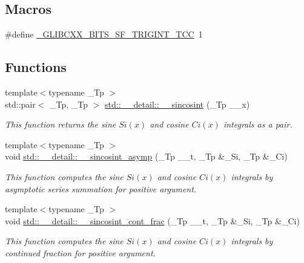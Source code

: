 \subsection*{Macros}
\begin{DoxyCompactItemize}
\item 
\#define \hyperlink{sf__trigint_8tcc_a8ba3ab1895ab4f89f7ee4d01d6db906e}{\+\_\+\+G\+L\+I\+B\+C\+X\+X\+\_\+\+B\+I\+T\+S\+\_\+\+S\+F\+\_\+\+T\+R\+I\+G\+I\+N\+T\+\_\+\+T\+CC}~1
\end{DoxyCompactItemize}
\subsection*{Functions}
\begin{DoxyCompactItemize}
\item 
{\footnotesize template$<$typename \+\_\+\+Tp $>$ }\\std\+::pair$<$ \+\_\+\+Tp, \+\_\+\+Tp $>$ \hyperlink{namespacestd_1_1____detail_a53bf807a99eef68cdb6f917c7ca085bf}{std\+::\+\_\+\+\_\+detail\+::\+\_\+\+\_\+sincosint} (\+\_\+\+Tp \+\_\+\+\_\+x)
\begin{DoxyCompactList}\small\item\em This function returns the sine $ Si(x) $ and cosine $ Ci(x) $ integrals as a {\ttfamily pair}. \end{DoxyCompactList}\item 
{\footnotesize template$<$typename \+\_\+\+Tp $>$ }\\void \hyperlink{namespacestd_1_1____detail_a976c3ff52c54001de3d409900c9bcb9c}{std\+::\+\_\+\+\_\+detail\+::\+\_\+\+\_\+sincosint\+\_\+asymp} (\+\_\+\+Tp \+\_\+\+\_\+t, \+\_\+\+Tp \&\+\_\+\+Si, \+\_\+\+Tp \&\+\_\+\+Ci)
\begin{DoxyCompactList}\small\item\em This function computes the sine $ Si(x) $ and cosine $ Ci(x) $ integrals by asymptotic series summation for positive argument. \end{DoxyCompactList}\item 
{\footnotesize template$<$typename \+\_\+\+Tp $>$ }\\void \hyperlink{namespacestd_1_1____detail_a211f552bca2944f64e3a1f5593690fda}{std\+::\+\_\+\+\_\+detail\+::\+\_\+\+\_\+sincosint\+\_\+cont\+\_\+frac} (\+\_\+\+Tp \+\_\+\+\_\+t, \+\_\+\+Tp \&\+\_\+\+Si, \+\_\+\+Tp \&\+\_\+\+Ci)
\begin{DoxyCompactList}\small\item\em This function computes the sine $ Si(x) $ and cosine $ Ci(x) $ integrals by continued fraction for positive argument. \end{DoxyCompactList}\item 

\end{DoxyCompactItemize}
